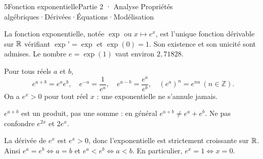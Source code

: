 \begin{ouverture}[exp]{5}{Fonction exponentielle}{Partie 2 · Analyse}
{Propriétés algébriques\enspace·\enspace Dérivées\enspace·\enspace Équations\enspace·\enspace Modélisation}
\end{ouverture}
\essentiel
{}
\begin{definition}
La fonction exponentielle, notée $\exp$ ou $x\mapsto e^x$, est l'unique
fonction dérivable sur $\mathbb{R}$ vérifiant $\exp'=\exp$ et $\exp(0)=1$.
Son existence et son unicité sont admises. Le nombre $e=\exp(1)$ vaut environ $2{,}71828$.
\end{definition}
\begin{propriete}
Pour tous réels $a$ et $b$,
\[e^{a+b}=e^ae^b,\quad e^{-a}=\frac1{e^a},\quad
e^{a-b}=\frac{e^a}{e^b},\quad (e^a)^n=e^{na}\ (n\in\mathbb Z).\]
On a $e^x>0$ pour tout réel $x$ : une exponentielle ne s'annule jamais.
\end{propriete}
\begin{attention}
$e^{a+b}$ est un produit, pas une somme : en général $e^{a+b}\neq e^a+e^b$.
Ne pas confondre $e^{2x}$ et $2e^x$.
\end{attention}
\begin{theoreme}
La dérivée de $e^x$ est $e^x>0$, donc l'exponentielle est strictement croissante
sur $\mathbb{R}$. Ainsi $e^a=e^b\iff a=b$ et $e^a<e^b\iff a<b$.
En particulier, $e^x=1\iff x=0$.
\end{theoreme}
\begin{center}\par{}\end{center}
